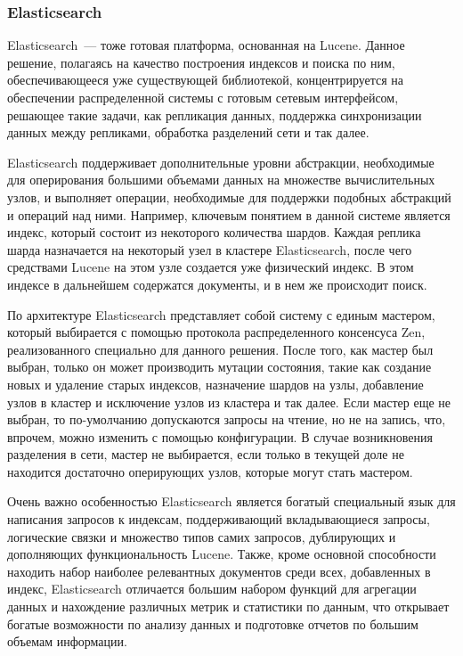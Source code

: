 \subsubsection{Elasticsearch}

Elasticsearch~--- тоже готовая платформа, основанная на Lucene. Данное решение, полагаясь на качество построения индексов и поиска по ним, обеспечивающееся уже существующей библиотекой, концентрируется на обеспечении распределенной системы с готовым сетевым интерфейсом, решающее такие задачи, как репликация данных, поддержка синхронизации данных между репликами, обработка разделений сети и так далее.

Elasticsearch поддерживает дополнительные уровни абстракции, необходимые для оперирования большими объемами данных на множестве вычислительных узлов, и выполняет операции, необходимые для поддержки подобных абстракций и операций над ними. Например, ключевым понятием в данной системе является индекс, который состоит из некоторого количества шардов. Каждая реплика шарда назначается на некоторый узел в кластере Elasticsearch, после чего средствами Lucene на этом узле создается уже физический индекс. В этом индексе в дальнейшем содержатся документы, и в нем же происходит поиск.

По архитектуре Elasticsearch представляет собой систему с единым мастером, который выбирается с помощью протокола распределенного консенсуса Zen, реализованного специально для данного решения. После того, как мастер был выбран, только он может производить мутации состояния, такие как создание новых и удаление старых индексов, назначение шардов на узлы, добавление узлов в кластер и исключение узлов из кластера и так далее. Если мастер еще не выбран, то по-умолчанию допускаются запросы на чтение, но не на запись, что, впрочем, можно изменить с помощью конфигурации. В случае возникновения разделения в сети, мастер не выбирается, если только в текущей доле не находится достаточно оперирующих узлов, которые могут стать мастером.

Очень важно особенностью Elasticsearch является богатый специальный язык для написания запросов к индексам, поддерживающий вкладывающиеся запросы, логические связки и множество типов самих запросов, дублирующих и дополняющих функциональность Lucene. Также, кроме основной способности находить набор наиболее релевантных документов среди всех, добавленных в индекс, Elasticsearch отличается большим набором функций для агрегации данных и нахождение различных метрик и статистики по данным, что открывает богатые возможности по анализу данных и подготовке отчетов по большим объемам информации.

